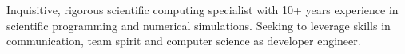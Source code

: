 \documentclass[10pt,a4paper,ragged2e]{../altacv}
\begin{document}

\begin{fullwidth}
\makecvheader

\vspace{-5mm}
\parbox{.7\paperwidth}{%
Inquisitive, rigorous scientific computing specialist with 10+ years experience in 
scientific programming and numerical simulations. Seeking to leverage skills in 
communication, team spirit and computer science as developer engineer.
%
%
}

\end{fullwidth}


\end{document}
